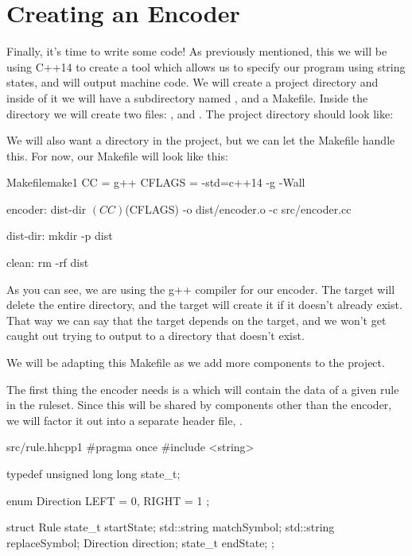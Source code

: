 \section{Creating an Encoder}

Finally, it's time to write some code! As previously mentioned, this we will be using C++14 to create a tool which allows us to specify our program using string states, and will output machine code. We will create a project directory and inside of it we will have a subdirectory named , and a Makefile. Inside the  directory we will create two files: , and . The project directory should look like:


We will also want a  directory in the project, but we can let the Makefile handle this. For now, our Makefile will look like  this:

\begin{file}{Makefile}{make}{1}
CC = g++
CFLAGS = -std=c++14 -g -Wall

encoder: dist-dir
	$(CC) $(CFLAGS) -o dist/encoder.o -c src/encoder.cc

dist-dir:
	mkdir -p dist

clean:
	rm -rf dist
\end{file}

As you can see, we are using the g++ compiler for our encoder. The  target will delete the entire  directory, and the  target will create it if it doesn't already exist. That way we can say that the  target depends on the  target, and we won't get caught out trying to output to a directory that doesn't exist.

We will be adapting this Makefile as we add more components to the project.

The first thing the encoder needs is a  which will contain the data of a given rule in the ruleset. Since this will be shared by components other than the encoder, we will factor it out into a separate header file, .

\begin{file}{src/rule.hh}{cpp}{1}
#pragma once
#include <string>

typedef unsigned long long state_t;

enum Direction
{
    LEFT = 0,
    RIGHT = 1
};

struct Rule
{
    state_t startState;
    std::string matchSymbol;
    std::string replaceSymbol;
    Direction direction;
    state_t endState;
};
\end{file}

